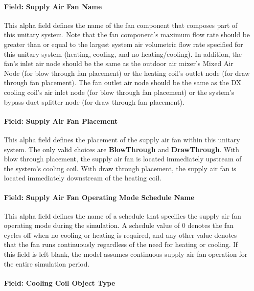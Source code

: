 \paragraph{Field: Supply Air Fan Name}\label{field-supply-air-fan-name-3}

This alpha field defines the name of the fan component that composes part of this unitary system. Note that the fan component's maximum flow rate should be greater than or equal to the largest system air volumetric flow rate specified for this unitary system (heating, cooling, and no heating/cooling). In addition, the fan's inlet air node should be the same as the outdoor air mixer's Mixed Air Node (for blow through fan placement) or the heating coil's outlet node (for draw through fan placement). The fan outlet air node should be the same as the DX cooling coil's air inlet node (for blow through fan placement) or the system's bypass duct splitter node (for draw through fan placement).

\paragraph{Field: Supply Air Fan Placement}\label{field-supply-air-fan-placement-1}

This alpha field defines the placement of the supply air fan within this unitary system. The only valid choices are \textbf{BlowThrough} and \textbf{DrawThrough}. With blow through placement, the supply air fan is located immediately upstream of the system's cooling coil. With draw through placement, the supply air fan is located immediately downstream of the heating coil.

\paragraph{Field: Supply Air Fan Operating Mode Schedule Name}\label{field-supply-air-fan-operating-mode-schedule-name-3}

This alpha field defines the name of a schedule that specifies the supply air fan operating mode during the simulation. A schedule value of 0 denotes the fan cycles off when no cooling or heating is required, and any other value denotes that the fan runs continuously regardless of the need for heating or cooling. If this field is left blank, the model assumes continuous supply air fan operation for the entire simulation period.

\paragraph{Field: Cooling Coil Object Type}\label{field-cooling-coil-object-type-6}

